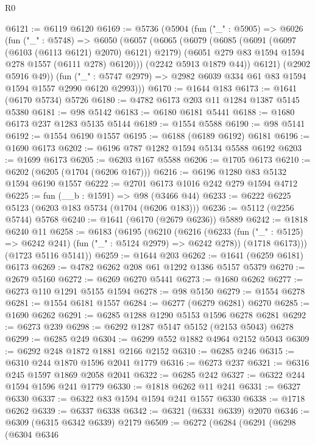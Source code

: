 \begin{lexlean}{R0}
\begin{coremodule}
@6121 := @6119 @6120
@6169 := @5736
    (@5904
      (fun ("_" : @5905) =>
      @6026
        (fun ("_" : @5748) =>
        @6050
          (@6057
            (@6065
              (@6079
                (@6085
                  (@6091 (@6097 (@6103 (@6113 @6121) @2070) @6121) @2179)
                  (@6051 @279 @83 @1594 @1594 @278 @1557 (@6111 @278) @6120)))
              (@2242 @5913 @1879 @44))
            @6121)
          (@2902 @5916 @49))
        (fun ("_" : @5747 @2979) => @2982 @6039 @334 @61 @83 @1594 @1594 @1557 @2990 @6120 @2993)))
@6170 := @1644 @183
@6173 := @1641 (@6170 @5734) @5726
@6180 := @4782 @6173 @203 @11 @1284 @1387 @5145 @5380
@6181 := @98 @5142
@6183 := @6180 @6181 @5441
@6188 := @1680 @6173 @237 @1283 @5135 @5144
@6189 := @1554 @5588
@6190 := @98 @5141
@6192 := @1554 @6190 @1557
@6195 := @6188 (@6189 @6192) @6181
@6196 := @1690 @6173
@6202 := @6196 @787 @1282 @1594 @5134 @5588 @6192
@6203 := @1699 @6173
@6205 := @6203 @167 @5588
@6206 := @1705 @6173
@6210 := @6202 (@6205 (@1704 (@6206 @167)))
@6216 := @6196 @1280 @83 @5132 @1594 @6190 @1557
@6222 := @2701 @6173 @1016 @242 @279 @1594 @4712
@6225 := fun (__b : @1591) => @98 (@3466 @44)
@6233 := @6222 @6225 @5123 (@6203 @183 @5734 (@1704 (@6206 @183)))
@6236 := @5112 (@2256 @5744) @5768
@6240 := @1641 (@6170 (@2679 @6236)) @5889
@6242 := @1818 @6240 @11
@6258 := @6183
    (@6195
      (@6210
        (@6216
          (@6233 (fun ("_" : @5125) => @6242 @241) (fun ("_" : @5124 @2979) => @6242 @278))
          (@1718 @6173)))
      (@1723 @5116 @5141))
@6259 := @1644 @203
@6262 := @1641 (@6259 @6181) @6173
@6269 := @4782 @6262 @208 @61 @1292 @1386 @5157 @5379
@6270 := @2679 @5160
@6272 := @6269 @6270 @5441
@6273 := @1680 @6262
@6277 := @6273 @110 @1291 @5155 @1594
@6278 := @98 @5150
@6279 := @1554 @6278
@6281 := @1554 @6181 @1557
@6284 := @6277 (@6279 @6281) @6270
@6285 := @1690 @6262
@6291 := @6285 @1288 @1290 @5153 @1596 @6278 @6281
@6292 := @6273 @239
@6298 := @6292 @1287 @5147 @5152 (@2153 @5043) @6278
@6299 := @6285 @249
@6304 := @6299 @552 @1882 @4964 @2152 @5043
@6309 := @6292 @248 @1872 @1881 @2166 @2152
@6310 := @6285 @246
@6315 := @6310 @244 @1870 @1596 @2041 @1779
@6316 := @6273 @237
@6321 := @6316 @245 @1597 @1869 @2058 @2041
@6322 := @6285 @242
@6327 := @6322 @244 @1594 @1596 @241 @1779
@6330 := @1818 @6262 @11 @241
@6331 := @6327 @6330
@6337 := @6322 @83 @1594 @1594 @241 @1557 @6330
@6338 := @1718 @6262
@6339 := @6337 @6338
@6342 := @6321 (@6331 @6339) @2070
@6346 := @6309 (@6315 @6342 @6339) @2179
@6509 := @6272
    (@6284
      (@6291
        (@6298
          (@6304
            @6346

\end{coremodule}
\end{lexlean}
